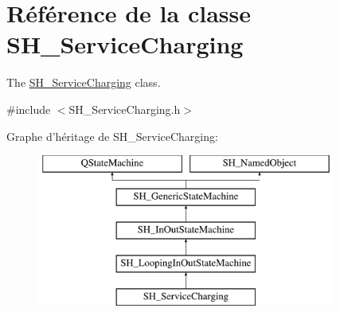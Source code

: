 \hypertarget{classSH__ServiceCharging}{\section{Référence de la classe S\-H\-\_\-\-Service\-Charging}
\label{classSH__ServiceCharging}
}


The \hyperlink{classSH__ServiceCharging}{S\-H\-\_\-\-Service\-Charging} class.  




{\ttfamily \#include $<$S\-H\-\_\-\-Service\-Charging.\-h$>$}

Graphe d'héritage de S\-H\-\_\-\-Service\-Charging\-:\begin{figure}[H]
\begin{center}
\leavevmode
\includegraphics[height=5.000000cm]{classSH__ServiceCharging}
\end{center}
\end{figure}
